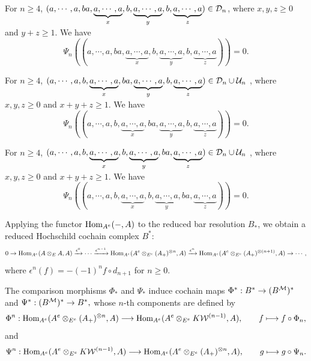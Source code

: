 \documentclass[10pt, reqno]{amsart}
\theoremstyle{definition}
\theoremstyle{remark}
\numberwithin{equation}{section}
\begin{document}
For \(n\ge4\), \((a,\cdots,a, ba, \underbrace{a,\cdots,a}_{x}, b, \underbrace{a,\cdots,a}_{y}, b, \underbrace{a,\cdots,a}_{z})\in \mathcal{D}_n\), where \(x,y,z\ge 0\) and \(y+z\ge1\). We have 
\begin{equation}\label{equ: ba,b,b}
    \Psi_n((a,\cdots,a, ba, \underbrace{a,\cdots,a}_{x}, b, \underbrace{a,\cdots,a}_{y}, b, \underbrace{a,\cdots,a}_{z}))=0.
\end{equation}


For \(n\ge4\), \((a,\cdots,a, b, \underbrace{a,\cdots,a}_{x}, ba, \underbrace{a,\cdots,a}_{y}, b, \underbrace{a,\cdots,a}_{z})\in \mathcal{D}_n \cup \mathcal{U}_n\) , where \(x,y,z\ge 0\) and \(x+y+z\ge1\). We have 
\begin{equation}\label{equ: b,ba,b}
    \Psi_n((a,\cdots,a, b, \underbrace{a,\cdots,a}_{x}, ba, \underbrace{a,\cdots,a}_{y}, b, \underbrace{a,\cdots,a}_{z}))=0.
\end{equation}


For \(n\ge4\), \((a,\cdots,a, b, \underbrace{a,\cdots,a}_{x}, b, \underbrace{a,\cdots,a}_{y}, ba, \underbrace{a,\cdots,a}_{z})\in \mathcal{D}_n\cup \mathcal{U}_n\) , where \(x,y,z\ge 0\) and \(x+y+z\ge1\). We have 
\begin{equation}\label{equ: b,b,ba}
    \Psi_n((a,\cdots,a, b, \underbrace{a,\cdots,a}_{x}, b, \underbrace{a,\cdots,a}_{y}, ba, \underbrace{a,\cdots,a}_{z}))=0.
\end{equation}



Applying the functor \( \mathrm{Hom}_{A^e}(-, A) \) to the reduced bar resolution $B_*$, we obtain a reduced Hochschild cochain complex $B^*$:
\[ 0\rightarrow \mathrm{Hom}_{A^e}(A\otimes_E A, A)\xrightarrow{\epsilon^0}\cdots\xrightarrow{\epsilon^{n-1}} \mathrm{Hom}_{A^e}(A^e\otimes_{E^e} (A_+)^{\otimes n}, A)\xrightarrow{\epsilon^n}\mathrm{Hom}_{A^e}(A^e\otimes_{E^e} (A_+)^{\otimes (n+1)}, A) \rightarrow \cdots, \]
where $\epsilon^n(f)=-(-1)^n f\circ d_{n+1}$ for $n\ge 0$.

The comparison morphisms $\Phi_*$ and $\Psi_*$ induce cochain maps $\Phi^*:B^*\to (B^{\mathcal{M}})^*$ and $\Psi^*:(B^{\mathcal{M}})^*\to B^*,$ whose \(n\)-th components are defined by
\[
\Phi^n:\mathrm{Hom}_{A^e}(A^e\otimes_{E^e}(A_+)^{\otimes n},A)
\longrightarrow
\mathrm{Hom}_{A^e}(A^e\otimes_{E^e}K\mathcal{W}^{(n-1)},A),
\qquad
f\longmapsto f\circ\Phi_n,
\]
and
\[
\Psi^n:\mathrm{Hom}_{A^e}(A^e\otimes_{E^e}K\mathcal{W}^{(n-1)},A)
\longrightarrow
\mathrm{Hom}_{A^e}(A^e\otimes_{E^e}(A_+)^{\otimes n},A),
\qquad
g\longmapsto g\circ\Psi_n.
\]
\end{document}
